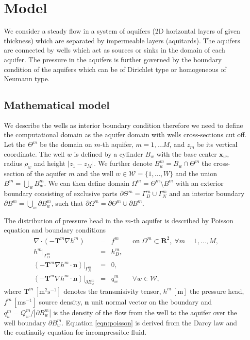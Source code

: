 \documentclass[preprint,12pt]{elsarticle}
\def\vc#1{\mathbf{\boldsymbol{#1}}}     %
\newcommand{\R}{\mathbf{R}}
\begin{document}
\section{Model}
\label{sec:model}
We consider a steady flow in a system of aquifers (2D horizontal layers of given thickness) which are separated by 
impermeable layers (aquitards). The aquifers are connected by wells which act as sources
or sinks in the domain of each aquifer. The pressure in the aquifers is further governed by the boundary 
condition of the aquifers which can be of Dirichlet type or homogeneous of Neumann type.

\subsection{Mathematical model}
We describe the wells as interior boundary condition therefore we need to define the computational domain
as the aquifer domain with wells cross-sections cut off. Let the $\Theta^m$ be the domain on $m$-th aquifer,
$m=1,\ldots M$, and $z_m$ be its vertical coordinate. The well $w$ is defined by a cylinder $B_w$
with the base center $\vc{x}_w$, radius $\rho_w$ and height $|z_1-z_M|$.  We further denote 
$B^m_w = B_w \cap \Theta^m$ the cross-section of the aquifer $m$ and the well $w\in\mathcal{W}=\{1,\ldots,W\}$
and the union $B^m=\bigcup\limits_{w}B^m_w$. 
We can then define domain $\Omega^m = \Theta^m\setminus B^m$ with an exterior boundary 
consisting of exclusive parts $\partial\Theta^m=\Gamma^m_D\cup\Gamma^m_N$ and an interior boundary 
$\partial B^m=\bigcup\limits_{w}\partial B^m_w$, 
such that $\partial\Omega^m=\partial\Theta^m\cup\partial B^m$.

The distribution of pressure head in the $m$-th aquifer is described by Poisson equation and 
boundary conditions
\begin{eqnarray} \label{eqn:poisson}
\nabla\cdot(-\mathbf{T}^m\nabla h^m) &=& f^m \qquad \textrm{on } \Omega^m\subset\R^2,\; \forall m=1,\dots,M, \\
h^m|_{\Gamma^m_D} &=& h^m_D, \\
\left(-\mathbf{T}^m\nabla h^m\cdot\vc{n}\right)|_{\Gamma^m_N} &=& 0, \\
\left(-\mathbf{T}^m\nabla h^m\cdot\vc{n}\right)|_{\partial B^m_w} &=& q^m_w \qquad \forall w\in\mathcal{W},
\end{eqnarray}
where $\mathbf{T}^m\, [\textrm{m}^2\textrm{s}^{-1}]$ denotes the transmisivity tensor,
$h^m\, [\textrm{m}]$ the pressure head, $f^m\, [\textrm{m}\textrm{s}^{-1}]$ source density,
$\vc{n}$ unit normal vector on the boundary and
$q^m_w = Q^m_w/|\partial B^m_w|$ is the density of the flow from the well to the aquifer over the well boundary 
$\partial B^m_w$. Equation \eqref{eqn:poisson} is derived from the Darcy law and the continuity equation 
for incompressible fluid.
\end{document}
